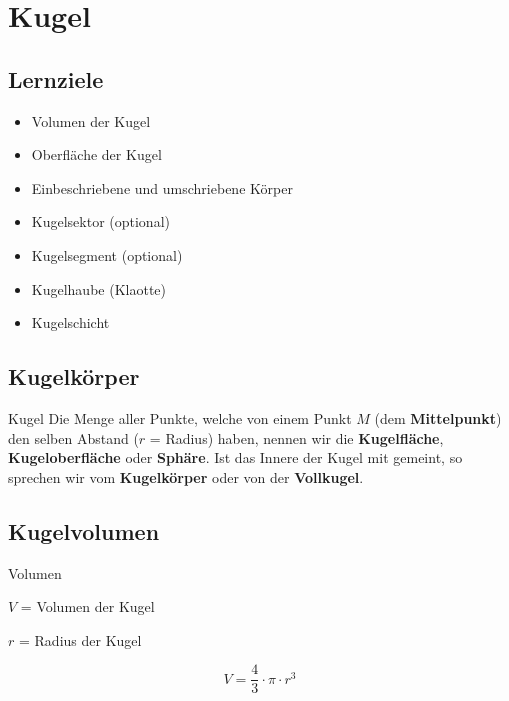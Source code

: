 \section{Kugel}


\subsection*{Lernziele}
\begin{itemize}
\item Volumen der Kugel
\item Oberfläche der Kugel
\item Einbeschriebene und umschriebene Körper
\item Kugelsektor (optional)
\item Kugelsegment (optional)
\item Kugelhaube (Klaotte)
\item Kugelschicht
\end{itemize}
\newpage

\subsection{Kugelkörper}


\begin{definition}{Kugel}{}
  Die Menge aller Punkte, welche von einem Punkt $M$ (dem \textbf{Mittelpunkt}) den selben Abstand ($r$ = Radius) haben, nennen wir die \textbf{Kugelfläche}, \textbf{Kugeloberfläche} oder \textbf{Sphäre}.
  Ist das Innere der Kugel mit gemeint, so sprechen wir vom \textbf{Kugelkörper} oder von der \textbf{Vollkugel}.
\end{definition}
\newpage

\subsection{Kugelvolumen}


\begin{gesetz}{Volumen}{}

  $V$ = Volumen der Kugel

  $r$ = Radius der Kugel

  $$V = \frac43\cdot{}\pi\cdot{}r^3$$
  \end{gesetz}

